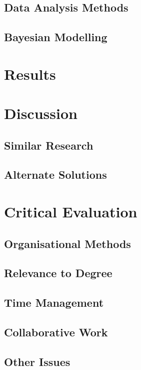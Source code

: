 \documentclass[11pt]{report}
\begin{document}
\section{Data Analysis Methods}
\label{sec:orgc343266}
\section{Bayesian Modelling}
\label{sec:orgc8df090}


\chapter{Results}
\label{sec:org6d014de}
\chapter{Discussion}
\label{sec:orgcd2dcb1}
\section{Similar Research}
\label{sec:org5fa1dd8}
\section{Alternate Solutions}
\label{sec:org3ef2dd4}
\chapter{Critical Evaluation}
\label{sec:org0c0c60b}
\section{Organisational Methods}
\label{sec:org065957d}
\section{Relevance to Degree}
\label{sec:org23a3042}
\section{Time Management}
\label{sec:orgfcfbe5d}
\section{Collaborative Work}
\label{sec:orgbe4cb47}
\section{Other Issues}
\label{sec:orgd284e69}
\end{document}
